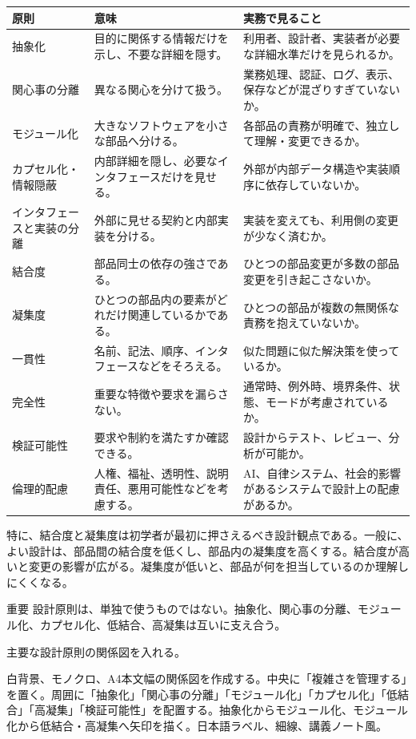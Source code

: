\documentclass[10.5pt,a4paper]{ltjsarticle}
\begin{document}
\begin{longtable}{L{34mm}L{55mm}L{76mm}}
\toprule
\textbf{原則} & \textbf{意味} & \textbf{実務で見ること} \\
\midrule
\endhead
抽象化 & 目的に関係する情報だけを示し、不要な詳細を隠す。 & 利用者、設計者、実装者が必要な詳細水準だけを見られるか。 \\
関心事の分離 & 異なる関心を分けて扱う。 & 業務処理、認証、ログ、表示、保存などが混ざりすぎていないか。 \\
モジュール化 & 大きなソフトウェアを小さな部品へ分ける。 & 各部品の責務が明確で、独立して理解・変更できるか。 \\
カプセル化・情報隠蔽 & 内部詳細を隠し、必要なインタフェースだけを見せる。 & 外部が内部データ構造や実装順序に依存していないか。 \\
インタフェースと実装の分離 & 外部に見せる契約と内部実装を分ける。 & 実装を変えても、利用側の変更が少なく済むか。 \\
結合度 & 部品同士の依存の強さである。 & ひとつの部品変更が多数の部品変更を引き起こさないか。 \\
凝集度 & ひとつの部品内の要素がどれだけ関連しているかである。 & ひとつの部品が複数の無関係な責務を抱えていないか。 \\
一貫性 & 名前、記法、順序、インタフェースなどをそろえる。 & 似た問題に似た解決策を使っているか。 \\
完全性 & 重要な特徴や要求を漏らさない。 & 通常時、例外時、境界条件、状態、モードが考慮されているか。 \\
検証可能性 & 要求や制約を満たすか確認できる。 & 設計からテスト、レビュー、分析が可能か。 \\
倫理的配慮 & 人権、福祉、透明性、説明責任、悪用可能性などを考慮する。 & AI、自律システム、社会的影響があるシステムで設計上の配慮があるか。 \\
\bottomrule
\end{longtable}

特に、結合度と凝集度は初学者が最初に押さえるべき設計観点である。一般に、よい設計は、部品間の結合度を低くし、部品内の凝集度を高くする。結合度が高いと変更の影響が広がる。凝集度が低いと、部品が何を担当しているのか理解しにくくなる。

\begin{pointbox}{重要}
設計原則は、単独で使うものではない。抽象化、関心事の分離、モジュール化、カプセル化、低結合、高凝集は互いに支え合う。
\end{pointbox}

\begin{todobox}
主要な設計原則の関係図を入れる。
\end{todobox}
\begin{promptbox}
白背景、モノクロ、A4本文幅の関係図を作成する。中央に「複雑さを管理する」を置く。周囲に「抽象化」「関心事の分離」「モジュール化」「カプセル化」「低結合」「高凝集」「検証可能性」を配置する。抽象化からモジュール化、モジュール化から低結合・高凝集へ矢印を描く。日本語ラベル、細線、講義ノート風。
\end{promptbox}
\end{document}
